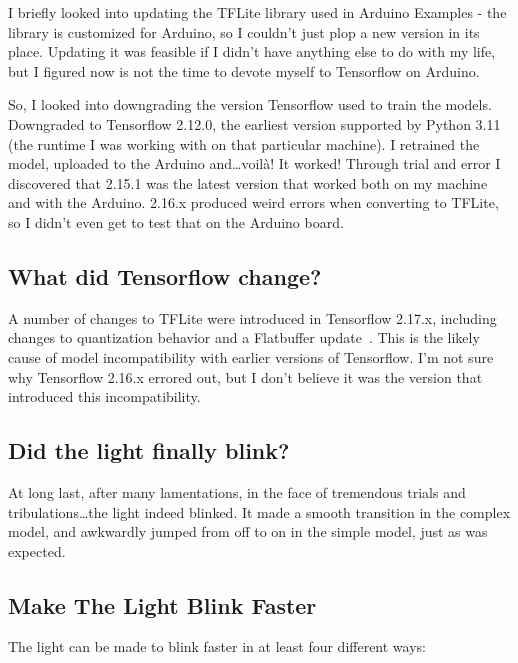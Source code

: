 \documentclass{article}
\begin{document}
    I briefly looked into updating the TFLite library used in Arduino Examples - the library is customized for Arduino, so I couldn't just plop a new version in its place.
    Updating it was feasible if I didn't have anything else to do with my life, but I figured now is not the time to devote myself to Tensorflow on Arduino.

    So, I looked into downgrading the version Tensorflow used to train the models.
    Downgraded to Tensorflow 2.12.0, the earliest version supported by Python 3.11 (the runtime I was working with on that particular machine).
    I retrained the model, uploaded to the Arduino and\ldots voilà!
    It worked!
    Through trial and error I discovered that 2.15.1 was the latest version that worked both on my machine and with the Arduino.
    2.16.x produced weird errors when converting to TFLite, so I didn't even get to test that on the Arduino board.

    \subsection{What did Tensorflow change?}\label{subsec:what-did-tensorflow-change?}

    A number of changes to TFLite were introduced in Tensorflow 2.17.x, including changes to quantization behavior and a Flatbuffer update~\cite{tensorflow2.17.0}.
    This is the likely cause of model incompatibility with earlier versions of Tensorflow.
    I'm not sure why Tensorflow 2.16.x errored out, but I don't believe it was the version that introduced this incompatibility.

    \subsection{Did the light finally blink?}\label{subsec:did-the-light-finally-blink?}

    At long last, after many lamentations, in the face of tremendous trials and tribulations\ldots the light indeed blinked.
    It made a smooth transition in the complex model, and awkwardly jumped from off to on in the simple model, just as was expected.

    \subsection{Make The Light Blink Faster}\label{subsec:make-the-light-blink-faster}

    The light can be made to blink faster in at least four different ways:
\end{document}
